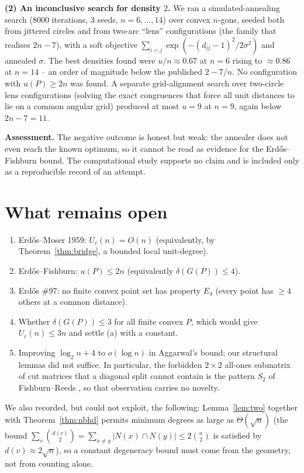 \documentclass[11pt]{article}
\theoremstyle{definition}
\theoremstyle{remark}
\newcommand{\UC}{U_c}
\begin{document}
\textbf{(2) An inconclusive search for density $2$.}  We ran a simulated-annealing
search (8000 iterations, 3 seeds, $n=6,\dots,14$) over convex $n$-gons, seeded both
from jittered circles and from two-arc ``lens'' configurations (the family that
realises $2n-7$), with a soft objective $\sum_{i<j}\exp(-(d_{ij}-1)^2/2\sigma^2)$ and
annealed $\sigma$.  The best densities found were $u/n\approx0.67$ at $n=6$ rising to
$\approx0.86$ at $n=14$ -- an order of magnitude below the published $2-7/n$.  No
configuration with $u(P)\ge2n$ was found.  A separate grid-alignment search over
two-circle lens configurations (solving the exact congruences that force all unit
distances to lie on a common angular grid) produced at most $u=9$ at $n=9$, again below
$2n-7=11$.

\smallskip
\noindent\textbf{Assessment.}  The negative outcome is honest but weak: the annealer
does not even reach the known optimum, so it cannot be read as evidence for the
Erd\H{o}s--Fishburn bound.  The computational study supports no claim and is included
only as a reproducible record of an attempt.

\section{What remains open}

\begin{enumerate}[label=\textup{(\alph*)}]
\item Erd\H{o}s--Moser 1959: $\UC(n)=O(n)$ (equivalently, by
Theorem~\ref{thm:bridge}, a bounded local unit-degree).
\item Erd\H{o}s--Fishburn: $u(P)\le2n$ (equivalently $\delta(G(P))\le4$).
\item Erd\H{o}s \#97: no finite convex point set has property $E_4$ (every point has
$\ge4$ others at a common distance).
\item Whether $\delta(G(P))\le3$ for all finite convex $P$, which would give
$\UC(n)\le3n$ and settle (a) with a constant.
\item Improving $\log_2 n+4$ to $o(\log n)$ in Aggarwal's bound; our structural lemmas
did not suffice.  In particular, the forbidden $2\times2$ all-ones submatrix of cut
matrices that a diagonal split cannot contain is the pattern $S_2$ of
Fishburn--Reeds \cite{FishburnReeds1992}, so that observation carries no novelty.
\end{enumerate}

We also recorded, but could not exploit, the following: Lemma~\ref{lem:two} together
with Theorem~\ref{thm:nbhd} permits minimum degrees as large as $\Theta(\sqrt n)$
(the bound $\sum_v\binom{d(v)}2=\sum_{x\ne y}|N(x)\cap N(y)|\le2\binom n2$ is satisfied
by $d(v)\approx2\sqrt n$), so a constant degeneracy bound must come from the geometry,
not from counting alone.
\end{document}
